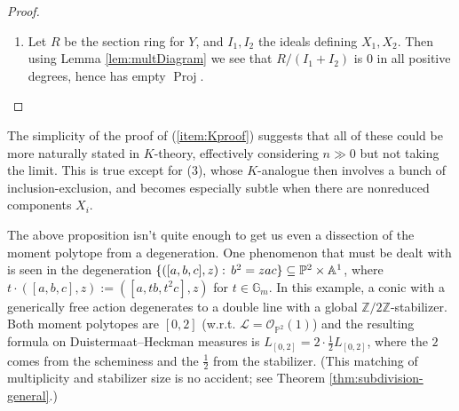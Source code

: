 \documentclass[10pt,a4paper]{amsart}
\DeclareMathOperator{\Proj}{Proj}
\newcommand{\RR}{\mathbb{R}}
\newcommand{\ZZ}{\mathbb{Z}}
\newcommand{\PP}{\mathbb{P}}
\def\AA{{\mathbb A }}
\newcommand\lie[1]{{\mathfrak #1}}
\newcommand\calO{{\mathcal O}}
\newcommand\calL{{\mathcal L}}
\newcommand\Gm{{\mathbb G}_m}
\renewcommand\AA{{\mathbb A}}
\renewcommand{\colon}{\mathrel{:}}
\renewcommand{\colon}{:\mkern\thinmuskip}
\begin{document}
\begin{proof}
\begin{enumerate}
    For the second claim, note first using (1) and (2) that
    $DH(X,\calL)$ is absolutely continuous with respect to Lebesgue
    measure on $\lie t^*_\RR$, for the simple reason that it equals
    Lebesgue measure times the function that is $\frac 1 d$ on
    $\Phi(X,\calL)$ and $0$ elsewhere,
    where $d$ is the size of the generic stabilizer.

    Note second that if $T$ acts with positive-dimensional stabilizer
    $R$ on $X_i$, then $DH(X_i,\calL)$ is {\em not} absolutely
    continuous with respect to Lebesgue measure on $\lie t^*_\RR$,
    because by Proposition \ref{prop:spanOfPhi} it is supported on
    a translate of a proper linear subspace (and is not zero, by the positivity
    in (2)). Since each $DH(X_i,\calL)$ is a positive measure, and
    they add up to one that is absolutely continuous with respect to
    Lebesgue measure on $\lie t^*_\RR$, each summand individually is likewise
    absolutely continuous, precluding the positive-dimensional stabilizers.
  \item Let $R$ be the section ring for $Y$, and $I_1,I_2$ the ideals
    defining $X_1,X_2$. Then using Lemma \ref{lem:multDiagram} we see
    that $R/(I_1+I_2)$ is $0$ in all positive degrees, hence has
    empty $\Proj$.
    \qedhere
  \end{enumerate}
\end{proof}

The simplicity of the proof of (\ref{item:Kproof}) suggests that all
of these could be more naturally stated in $K$-theory, effectively
considering $n\gg 0$ but not taking the limit. This is true except for (3),
whose $K$-analogue then involves a bunch of inclusion-exclusion, and
becomes especially subtle when there are nonreduced components $X_i$.

The above proposition isn't quite enough to get us even
a dissection of the moment polytope from a degeneration.
One phenomenon that must be dealt with is seen in the degeneration
$\{([a,b,c],z)\colon b^2 = zac\} \subseteq \PP^2 \times \AA^1$, where
$t\cdot ([a,b,c],z) := ([a,tb,t^2c],z)$ for $t\in\Gm$. In this example,
a conic with a generically free action degenerates to a double line with a
global $\ZZ/2\ZZ$-stabilizer. Both moment polytopes are $[0,2]$ (w.r.t.
$\calL = \calO_{\PP^2}(1)$) and the resulting formula on
Duistermaat--Heckman measures is $L_{[0,2]} = 2\cdot\frac 1 2 L_{[0,2]}$,
where the $2$ comes from the scheminess and the $\frac 1 2$ from the stabilizer.
(This matching of multiplicity and stabilizer size is no accident; see Theorem \ref{thm:subdivision-general}.)
\end{document}
